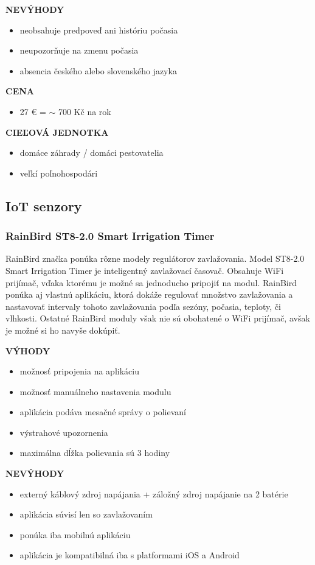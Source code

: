 \documentclass[twoside]{ctuthesis}
\theoremstyle{plain}
\theoremstyle{definition}
\theoremstyle{note}
\begin{document}
\textbf{NEVÝHODY}
\begin{itemize}
\item neobsahuje predpoveď ani históriu počasia
\item neupozorňuje na zmenu počasia
\item absencia českého alebo slovenského jazyka
\end{itemize}

\textbf{CENA}
\begin{itemize}
\item 27 € = $\sim$ 700 Kč na rok
\end{itemize}

\textbf{CIEĽOVÁ JEDNOTKA}
\begin{itemize}
\item domáce záhrady / domáci pestovatelia
\item veľkí poľnohospodári
\end{itemize} 

\subsection{IoT senzory}

\subsubsection*{RainBird ST8-2.0 Smart Irrigation Timer}
RainBird značka ponúka rôzne modely regulátorov zavlažovania. Model ST8-2.0 Smart Irrigation Timer je inteligentný zavlažovací časovač. Obsahuje WiFi prijímač, vďaka ktorému je možné sa jednoducho pripojiť na modul. RainBird ponúka aj vlastnú aplikáciu, ktorá dokáže regulovať množstvo zavlažovania a nastavovať intervaly tohoto zavlažovania podľa sezóny, počasia, teploty, či vlhkosti. Ostatné RainBird moduly však nie sú obohatené o WiFi prijímač, avšak je možné si ho navyše dokúpiť. \cite{rainbird}
\newline

\textbf{VÝHODY}
\begin{itemize}
\item možnosť pripojenia na aplikáciu
\item možnosť manuálneho nastavenia modulu
\item aplikácia podáva mesačné správy o polievaní
\item výstrahové upozornenia
\item maximálna dĺžka polievania sú 3 hodiny
\end{itemize}

\textbf{NEVÝHODY}
\begin{itemize}
\item externý káblový zdroj napájania + záložný zdroj napájanie na 2 batérie 
\item aplikácia súvisí len so zavlažovaním
\item ponúka iba mobilnú aplikáciu 
\item aplikácia je kompatibilná iba s platformami iOS a Android
\end{itemize}
\end{document}
